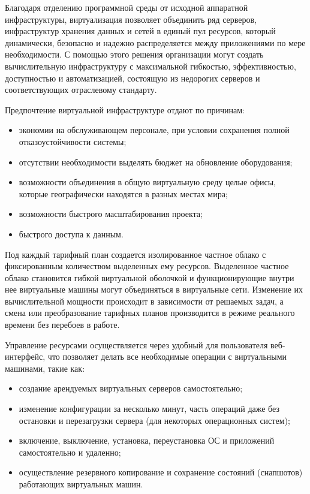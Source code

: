 Благодаря отделению программной среды от исходной аппаратной инфраструктуры, виртуализация позволяет объединить ряд серверов, инфраструктур хранения данных и сетей в единый пул ресурсов, который динамически, безопасно и надежно распределяется между приложениями по мере необходимости.
С помощью этого решения организации могут создать вычислительную инфраструктуру с максимальной гибкостью, эффективностью, доступностью и автоматизацией, состоящую из недорогих серверов и соответствующих отраслевому стандарту.

Предпочтение виртуальной инфраструктуре отдают по причинам:
\begin{itemize}
  \item экономии на обслуживающем персонале, при условии сохранения полной отказоустойчивости системы;
  \item отсутствии необходимости выделять бюджет на обновление оборудования;
  \item возможности объединения в общую виртуальную среду целые офисы, которые географически находятся в разных местах мира;
  \item возможности быстрого масштабирования проекта;
  \item быстрого доступа к данным.
\end{itemize}

Под каждый тарифный план создается изолированное частное облако с фиксированным количеством выделенных ему ресурсов.
Выделенное частное облако становится гибкой виртуальной оболочкой и функционирующие внутри нее виртуальные машины могут объединяться в виртуальные сети.
Изменение их вычислительной мощности происходит в зависимости от решаемых задач, а смена или преобразование тарифных планов производится в режиме реального времени без перебоев в работе.

Управление ресурсами осуществляется через удобный для пользователя веб-интерфейс, что позволяет делать все необходимые операции с виртуальными машинами, такие как:
\begin{itemize}
  \item создание арендуемых виртуальных серверов самостоятельно;
  \item изменение конфигурации за несколько минут, часть операций даже без остановки и перезагрузки сервера (для некоторых операционных систем);
  \item включение, выключение, установка, переустановка ОС и приложений самостоятельно и удаленно;
  \item осуществление резервного копирование и сохранение состояний (снапшотов) работающих виртуальных машин.
\end{itemize}

\clearpage